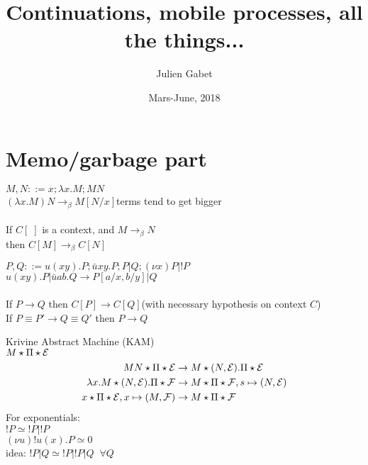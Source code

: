 \documentclass[a4paper,12pt]{book}
\title{Continuations, mobile processes, all the things...}
\author{Julien Gabet}
\date{Mars-June, 2018}
\begin{document}
\everymath{\displaystyle}

\maketitle

\chapter*{Memo/garbage part}

\noindent$M,N::= x ; \lambda x.M ; MN$\\
$(\lambda x.M)N \rightarrow_\beta M[N/x]$\hfill terms tend to get bigger\\
~\\
If $C[\;]$ is a context, and $M\rightarrow_\beta N$\\
\;\; then $C[M]\rightarrow_\beta C[N]$

\noindent\hrulefill

\noindent$P,Q::= u(xy).P ; \bar{u}xy.P ; P|Q ; (\nu x)P | !P$\\
$u(xy).P | \bar{u}ab.Q \rightarrow P[a/x,b/y] | Q$\\
~\\
If $P\rightarrow Q$ then $C[P]\rightarrow C[Q]$\hfill (with necessary hypothesis on context $C$)\\
If $P\equiv P'\rightarrow Q\equiv Q'$ then $P\rightarrow Q$

\noindent\hrulefill

\noindent Krivine Abstract Machine (KAM)\\
$M\star\Pi\star\mathcal{E}$\\
\begin{align*}
MN\star\Pi\star\mathcal{E} &\rightarrow M\star(N,\mathcal{E}).\Pi\star\mathcal{E}\\
\lambda x.M\star(N,\mathcal{E}).\Pi\star\mathcal{F} &\rightarrow M\star\Pi\star\mathcal{F},s\mapsto(N,\mathcal{E})\\
x\star\Pi\star\mathcal{E},x\mapsto(M,\mathcal{F}) &\rightarrow M\star\Pi\star\mathcal{F}
\end{align*}
For exponentials:\\
\indent$!P\simeq!P|!P$\\
\indent$(\nu u)!u(x).P\simeq 0$\\
idea: $!P|Q\simeq!P|!P|Q \;\; \forall Q$

\noindent\hrulefill
\end{document}
